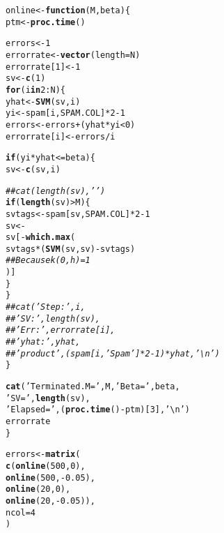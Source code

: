 \documentclass[11pt,english]{article}\usepackage[]{graphicx}\usepackage[]{color}
\makeatletter
\newcommand{\hlnum}[1]{\textcolor[rgb]{0.686,0.059,0.569}{#1}}%
\newcommand{\hlstr}[1]{\textcolor[rgb]{0.192,0.494,0.8}{#1}}%
\newcommand{\hlcom}[1]{\textcolor[rgb]{0.678,0.584,0.686}{\textit{#1}}}%
\newcommand{\hlopt}[1]{\textcolor[rgb]{0,0,0}{#1}}%
\newcommand{\hlstd}[1]{\textcolor[rgb]{0.345,0.345,0.345}{#1}}%
\newcommand{\hlkwa}[1]{\textcolor[rgb]{0.161,0.373,0.58}{\textbf{#1}}}%
\newcommand{\hlkwb}[1]{\textcolor[rgb]{0.69,0.353,0.396}{#1}}%
\newcommand{\hlkwc}[1]{\textcolor[rgb]{0.333,0.667,0.333}{#1}}%
\newcommand{\hlkwd}[1]{\textcolor[rgb]{0.737,0.353,0.396}{\textbf{#1}}}%
\newenvironment{kframe}{%
 \def\at@end@of@kframe{}%
 \ifinner\ifhmode%
  \def\at@end@of@kframe{\end{minipage}}%
  \begin{minipage}{\columnwidth}%
 \fi\fi%
 \def\FrameCommand##1{\hskip\@totalleftmargin \hskip-\fboxsep
 \colorbox{shadecolor}{##1}\hskip-\fboxsep
     \hskip-\linewidth \hskip-\@totalleftmargin \hskip\columnwidth}%
 \MakeFramed {\advance\hsize-\width
   \@totalleftmargin\z@ \linewidth\hsize
   \@setminipage}}%
 {\par\unskip\endMakeFramed%
 \at@end@of@kframe}
\newenvironment{knitrout}{}{} %
\makeatother
\begin{document}
\begin{knitrout}
\begin{kframe}
\begin{alltt}
\hlstd{online} \hlkwb{<-} \hlkwa{function} \hlstd{(}\hlkwc{M}\hlstd{,} \hlkwc{beta}\hlstd{) \{}
    \hlstd{ptm} \hlkwb{<-} \hlkwd{proc.time}\hlstd{()}

    \hlstd{errors} \hlkwb{<-} \hlnum{1}
    \hlstd{errorrate} \hlkwb{<-} \hlkwd{vector}\hlstd{(}\hlkwc{length} \hlstd{= N)}
    \hlstd{errorrate[}\hlnum{1}\hlstd{]} \hlkwb{<-} \hlnum{1}
    \hlstd{sv} \hlkwb{<-} \hlkwd{c}\hlstd{(}\hlnum{1}\hlstd{)}
    \hlkwa{for}\hlstd{(i} \hlkwa{in} \hlnum{2}\hlopt{:}\hlstd{N) \{}
        \hlstd{yhat} \hlkwb{<-} \hlkwd{SVM}\hlstd{(sv, i)}
        \hlstd{yi} \hlkwb{<-} \hlstd{spam[i,SPAM.COL]} \hlopt{*} \hlnum{2} \hlopt{-} \hlnum{1}
        \hlstd{errors} \hlkwb{<-} \hlstd{errors} \hlopt{+} \hlstd{(yhat} \hlopt{*} \hlstd{yi} \hlopt{<} \hlnum{0}\hlstd{)}
        \hlstd{errorrate[i]} \hlkwb{<-} \hlstd{errors} \hlopt{/} \hlstd{i}

        \hlkwa{if} \hlstd{( yi} \hlopt{*} \hlstd{yhat} \hlopt{<=} \hlstd{beta ) \{}
            \hlstd{sv} \hlkwb{<-} \hlkwd{c}\hlstd{(sv, i)}

            \hlcom{## cat(length(sv), ' ')}
            \hlkwa{if} \hlstd{(}\hlkwd{length}\hlstd{(sv)} \hlopt{>} \hlstd{M) \{}
                \hlstd{svtags} \hlkwb{<-} \hlstd{spam[sv,SPAM.COL]} \hlopt{*}\hlnum{2} \hlopt{-}\hlnum{1}
                \hlstd{sv} \hlkwb{<-}
                    \hlstd{sv[}\hlopt{-}\hlkwd{which.max}\hlstd{(}
                            \hlstd{svtags} \hlopt{*} \hlstd{(}\hlkwd{SVM}\hlstd{(sv,sv)} \hlopt{-} \hlstd{svtags)}
                            \hlcom{## Because k(0,h) = 1}
                        \hlstd{)]}
            \hlstd{\}}
        \hlstd{\}}
        \hlcom{## cat('Step:', i,}
        \hlcom{##     'SV:', length(sv),}
        \hlcom{##     'Err:', errorrate[i],}
        \hlcom{##     'yhat:', yhat,}
        \hlcom{##     'product', (spam[i,'Spam'] * 2 - 1) * yhat, '\textbackslash{}n')}
    \hlstd{\}}

    \hlkwd{cat}\hlstd{(}\hlstr{'Terminated. M ='}\hlstd{, M,}\hlstr{'Beta ='}\hlstd{, beta,}
        \hlstr{'SV = '}\hlstd{,} \hlkwd{length}\hlstd{(sv),}
        \hlstr{'Elapsed ='}\hlstd{, (}\hlkwd{proc.time}\hlstd{()} \hlopt{-} \hlstd{ptm)[}\hlnum{3}\hlstd{],} \hlstr{'\textbackslash{}n'} \hlstd{)}
    \hlstd{errorrate}
\hlstd{\}}

\hlstd{errors} \hlkwb{<-} \hlkwd{matrix}\hlstd{(}
    \hlkwd{c}\hlstd{(}\hlkwd{online}\hlstd{(}\hlnum{500}\hlstd{,} \hlnum{0}\hlstd{),}
      \hlkwd{online}\hlstd{(}\hlnum{500}\hlstd{,} \hlopt{-}\hlnum{0.05}\hlstd{),}
      \hlkwd{online}\hlstd{(}\hlnum{20}\hlstd{,} \hlnum{0}\hlstd{),}
      \hlkwd{online}\hlstd{(}\hlnum{20}\hlstd{,} \hlopt{-}\hlnum{0.05}\hlstd{)),}
    \hlkwc{ncol} \hlstd{=} \hlnum{4}
\hlstd{)}



\end{alltt}
\end{kframe}
\end{knitrout}
\end{document}
